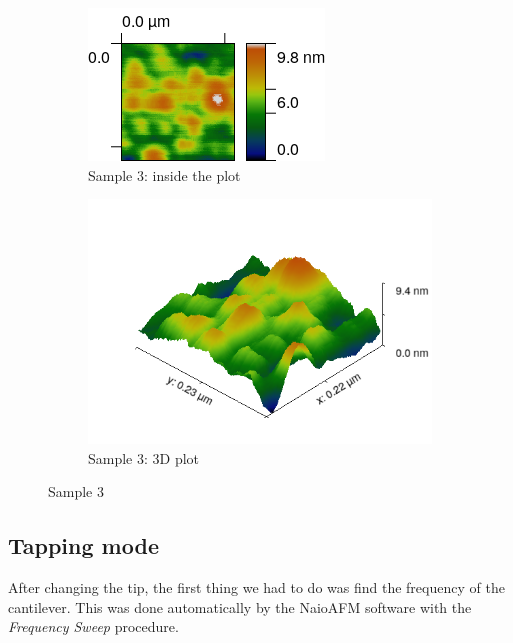 \documentclass[11pt,a4paper]{article}
\begin{document}
\begin{figure}[H]
\centering
\begin{subfigure}[b]{0.45\textwidth}
\includegraphics[width=\textwidth]{sm_sample3}
\caption{Sample 3: inside the plot}
\end{subfigure}
\begin{subfigure}[b]{0.45\textwidth}
\includegraphics[width=\textwidth]{sm_sample3_3D_improved}
\caption{Sample 3: 3D plot}
\end{subfigure}
\caption{Sample 3}
\label{fig:sample3_light_green}
\end{figure}

\subsection{Tapping mode}
After changing the tip, the first thing we had to do was find the frequency of the cantilever. This was done automatically by the NaioAFM software with the \emph{Frequency Sweep} procedure.
\end{document}
